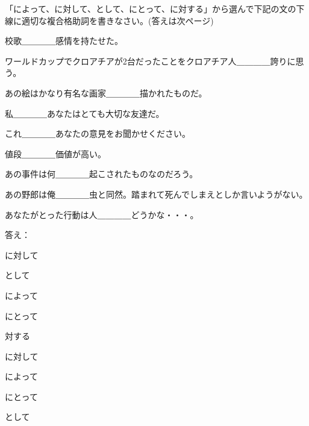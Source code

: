 
\author{Marko Miličić,Željka Ludošan}



		
	\begin{mondai}{「によって、に対して、として、にとって、に対する」から選んで下記の文の下線に適切な複合格助詞を書きなさい。(答えは次ページ)}
		\item 校歌＿＿＿＿感情を持たせた。
		\item ワールドカップでクロアチアが2台だったことをクロアチア人＿＿＿＿誇りに思う。
		\item あの絵はかなり有名な画家＿＿＿＿描かれたものだ。
		\item 私＿＿＿＿あなたはとても大切な友達だ。
		\item これ＿＿＿＿あなたの意見をお聞かせください。
		\item 値段＿＿＿＿価値が高い。
		\item あの事件は何＿＿＿＿起こされたものなのだろう。
		\item あの野郎は俺＿＿＿＿虫と同然。踏まれて死んでしまえとしか言いようがない。
		\item あなたがとった行動は人＿＿＿＿どうかな・・・。
	\end{mondai}
	
	\newpage
	\begin{mondai}{答え：}
		\item に対して
		\item として
		\item によって
		\item にとって
		\item 対する
		\item に対して
		\item によって
		\item にとって
		\item として
		

	\end{mondai}
	

